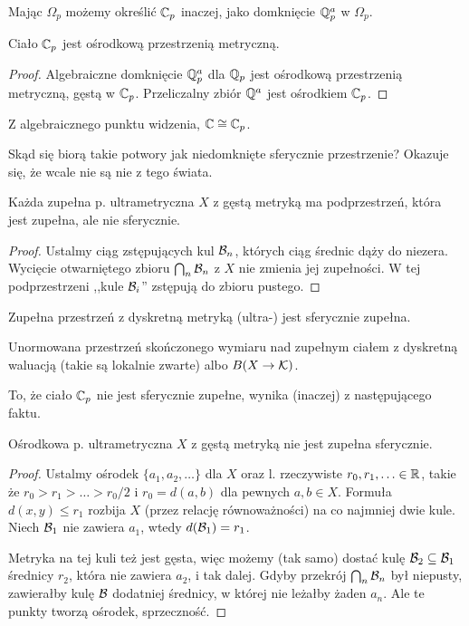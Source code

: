 Mając $\Omega_p$ możemy określić $\mathbb C_p$ inaczej, jako domknięcie $\mathbb Q_p^a$ w $\Omega_p$.

\begin{fakt}
	Ciało $\mathbb C_p$ jest ośrodkową przestrzenią metryczną.
\end{fakt}

\begin{proof}
	Algebraiczne domknięcie $\mathbb Q_p^a$ dla $\mathbb Q_p$ jest ośrodkową przestrzenią metryczną, gęstą w $\mathbb C_p$.
	Przeliczalny zbiór $\mathbb Q^a$ jest ośrodkiem $\mathbb C_p$.
\end{proof}

\begin{fakt}
	Z algebraicznego punktu widzenia, $\mathbb C \cong \mathbb C_p$.
\end{fakt}

Skąd się biorą takie potwory jak niedomknięte sferycznie przestrzenie?
Okazuje się, że wcale nie są nie z tego świata.

\begin{fakt}
	Każda zupełna p. ultrametryczna $X$ z gęstą metryką ma podprzestrzeń, która jest zupełna, ale nie sferycznie.
\end{fakt}

\begin{proof}
	Ustalmy ciąg zstępujących kul $\mathcal B_n$, których ciąg średnic dąży do niezera.
	Wycięcie otwarniętego zbioru $\bigcap_n \mathcal B_n$ z $X$ nie zmienia jej zupełności.
	W tej podprzestrzeni ,,kule $\mathcal B_i$'' zstępują do zbioru pustego.
\end{proof}

\begin{fakt}
	Zupełna przestrzeń z dyskretną metryką (ultra-) jest sferycznie zupełna.
\end{fakt}

\begin{przyklad}
	Unormowana przestrzeń skończonego wymiaru nad zupełnym ciałem z dyskretną waluacją (takie są lokalnie zwarte) albo $B(X \to \mathcal K)$.
\end{przyklad}

To, że ciało $\mathbb C_p$ nie jest sferycznie zupełne, wynika (inaczej) z następującego faktu.

\begin{fakt}
	Ośrodkowa p. ultrametryczna $X$ z gęstą metryką nie jest zupełna sferycznie.
\end{fakt}

\begin{proof}
	Ustalmy ośrodek $\{a_1, a_2, \ldots\}$ dla $X$ oraz l. rzeczywiste $r_0, r_1,  \ldots \in \mathbb R$, takie że $r_0 > r_1 > \ldots > r_0 / 2$ i $r_0 = d(a,b)$ dla pewnych $a, b \in X$.
	Formuła $d(x,y) \le r_1$ rozbija $X$ (przez relację równoważności) na co najmniej dwie kule.
	Niech $\mathcal B_1$ nie zawiera $a_1$, wtedy $d(\mathcal B_1) = r_1$.

	Metryka na tej kuli też jest gęsta, więc możemy (tak samo) dostać kulę $\mathcal B_2 \subseteq \mathcal B_1$ średnicy $r_2$, która nie zawiera $a_2$, i tak dalej.
	Gdyby przekrój $\bigcap_n \mathcal B_n$ był niepusty, zawierałby kulę $\mathcal B$ dodatniej średnicy, w której nie leżałby żaden $a_n$.
	Ale te punkty tworzą ośrodek, sprzeczność.
\end{proof}

